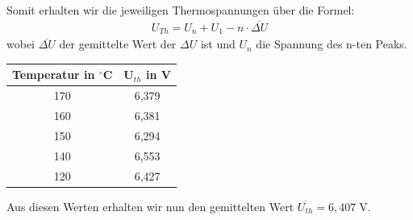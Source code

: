 Somit erhalten wir die jeweiligen Thermospannungen über die Formel:
\begin{align*}
U_{Th}=U_{n}+U_{1}-n\cdot \overline{\Delta U}
\end{align*}
wobei $ \overline{\Delta U} $ der gemittelte Wert der $ \Delta U $ ist und $ U_{n} $ die Spannung des n-ten Peaks.
\begin{center}
	\begin{tabular}{|c|c|}
		\hline
		Temperatur in $^\circ$C & U$_{th}$ in V \\ \hline
		170           &     6,379     \\ \hline
		160           &     6,381     \\ \hline
		150           &     6,294     \\ \hline
		140           &     6,553     \\ \hline
		120           &     6,427     \\ \hline
	\end{tabular} 
\end{center}
Aus diesen Werten erhalten wir nun den gemittelten Wert $ \overline{U_{th}} =6,407\; $V.
